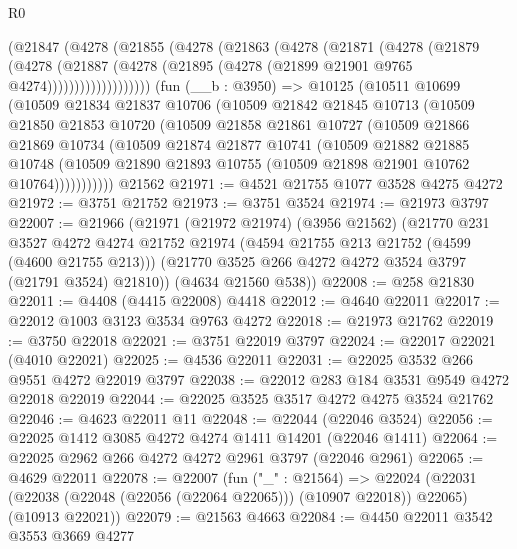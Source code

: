 \begin{lexlean}{R0}
\begin{coremodule}
            (@21847
              (@4278
                (@21855
                  (@4278
                    (@21863
                      (@4278
                        (@21871
                          (@4278
                            (@21879
                              (@4278
                                (@21887
                                  (@4278
                                    (@21895 (@4278 (@21899 @21901 @9765 @4274)))))))))))))))))))
    (fun (__b : @3950) =>
    @10125
      (@10511
        @10699
        (@10509
          @21834
          @21837
          @10706
          (@10509
            @21842
            @21845
            @10713
            (@10509
              @21850
              @21853
              @10720
              (@10509
                @21858
                @21861
                @10727
                (@10509
                  @21866
                  @21869
                  @10734
                  (@10509
                    @21874
                    @21877
                    @10741
                    (@10509
                      @21882
                      @21885
                      @10748
                      (@10509 @21890 @21893 @10755 (@10509 @21898 @21901 @10762 @10764)))))))))))
    @21562
@21971 := @4521 @21755 @1077 @3528 @4275 @4272
@21972 := @3751 @21752
@21973 := @3751 @3524
@21974 := @21973 @3797
@22007 := @21966
    (@21971
      (@21972 @21974)
      (@3956 @21562)
      (@21770
        @231
        @3527
        @4272
        @4274
        @21752
        @21974
        (@4594 @21755 @213 @21752 (@4599 (@4600 @21755 @213)))
        (@21770 @3525 @266 @4272 @4272 @3524 @3797 (@21791 @3524) @21810))
      (@4634 @21560 @538))
@22008 := @258 @21830
@22011 := @4408 (@4415 @22008) @4418
@22012 := @4640 @22011
@22017 := @22012 @1003 @3123 @3534 @9763 @4272
@22018 := @21973 @21762
@22019 := @3750 @22018
@22021 := @3751 @22019 @3797
@22024 := @22017 @22021 (@4010 @22021)
@22025 := @4536 @22011
@22031 := @22025 @3532 @266 @9551 @4272 @22019 @3797
@22038 := @22012 @283 @184 @3531 @9549 @4272 @22018 @22019
@22044 := @22025 @3525 @3517 @4272 @4275 @3524 @21762
@22046 := @4623 @22011 @11
@22048 := @22044 (@22046 @3524)
@22056 := @22025 @1412 @3085 @4272 @4274 @1411 @14201 (@22046 @1411)
@22064 := @22025 @2962 @266 @4272 @4272 @2961 @3797 (@22046 @2961)
@22065 := @4629 @22011
@22078 := @22007
    (fun ("_" : @21564) =>
    @22024
      (@22031 (@22038 (@22048 (@22056 (@22064 @22065))) (@10907 @22018)) @22065)
      (@10913 @22021))
@22079 := @21563 @4663
@22084 := @4450 @22011 @3542 @3553 @3669 @4277

\end{coremodule}
\end{lexlean}
